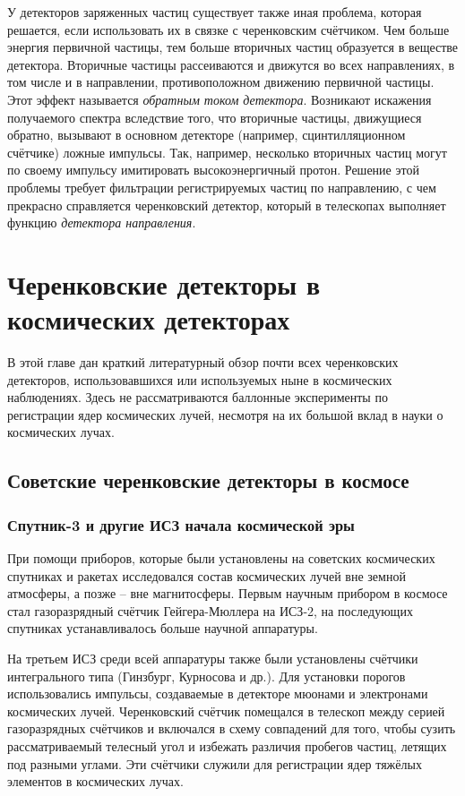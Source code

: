 \documentclass[12pt,a4paper]{report} %
\begin{document}
У детекторов заряженных частиц существует также иная проблема, которая решается, если использовать их в связке с черенковским счётчиком.
Чем больше энергия первичной частицы, тем больше вторичных частиц образуется в веществе детектора.
Вторичные частицы рассеиваются и движутся во всех направлениях, в том числе и в направлении, противоположном движению первичной частицы. 
Этот эффект называется \textit{обратным током детектора}.
Возникают искажения получаемого спектра вследствие того, что вторичные частицы, движущиеся обратно, вызывают в основном детекторе (например, сцинтилляционном счётчике) ложные импульсы.
Так, например, несколько вторичных частиц могут по своему импульсу имитировать высокоэнергичный протон.
Решение этой проблемы требует фильтрации регистрируемых частиц по направлению, с чем прекрасно справляется черенковский детектор, который в телескопах выполняет функцию \textit{детектора направления}.
\chapter{Черенковские детекторы в космических детекторах}
В этой главе дан краткий литературный обзор почти всех черенковских детекторов, использовавшихся или используемых ныне в космических наблюдениях. Здесь не рассматриваются баллонные эксперименты по регистрации ядер космических лучей, несмотря на их большой вклад в науки о космических лучах.
\section{Советские черенковские детекторы в космосе}

\subsection{Спутник-3 и другие ИСЗ начала космической эры}

При помощи приборов, которые были установлены на советских космических спутниках и ракетах исследовался состав космических лучей вне земной атмосферы, а позже -- вне магнитосферы. Первым научным прибором в космосе стал газоразрядный счётчик Гейгера-Мюллера на ИСЗ-2, на последующих спутниках устанавливалось больше научной аппаратуры. 

На третьем ИСЗ среди всей аппаратуры также были установлены счётчики интегрального типа (Гинзбург, Курносова и др.\cite{Ginzburg}).
Для установки порогов использовались импульсы, создаваемые в детекторе мюонами и электронами космических лучей. 
Черенковский счётчик помещался в телескоп между серией газоразрядных счётчиков и включался в схему совпадений для того, чтобы сузить рассматриваемый телесный угол и избежать различия пробегов частиц, летящих под разными углами. Эти счётчики служили для регистрации ядер тяжёлых элементов в космических лучах. 
\end{document}
